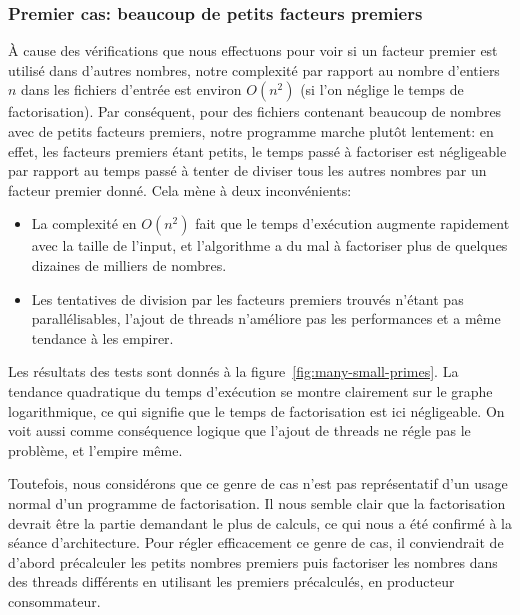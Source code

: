 \documentclass[a4paper,10pt]{article}
\begin{document}
\newpage
\subsubsection*{Premier cas: beaucoup de petits facteurs premiers}

À cause des vérifications que nous effectuons pour voir si un facteur premier est utilisé dans d'autres nombres, notre complexité par rapport au nombre d'entiers $n$ dans les fichiers d'entrée est environ $O(n^2)$ (si l'on néglige le temps de factorisation). Par conséquent, pour des fichiers contenant beaucoup de nombres avec de petits facteurs premiers, notre programme marche plutôt lentement: en effet, les facteurs premiers étant petits, le temps passé à factoriser est négligeable par rapport au temps passé à tenter de diviser tous les autres nombres par un facteur premier donné. Cela mène à deux inconvénients:
\begin{itemize}
    \item La complexité en $O(n^2)$ fait que le temps d'exécution augmente rapidement avec la taille de l'input, et l'algorithme a du mal à factoriser plus de quelques dizaines de milliers de nombres.
    \item Les tentatives de division par les facteurs premiers trouvés n'étant pas parallélisables, l'ajout de threads n'améliore pas les performances et a même tendance à les empirer.
\end{itemize}

Les résultats des tests sont donnés à la figure~\ref{fig:many-small-primes}. La tendance quadratique du temps d'exécution se montre clairement sur le graphe logarithmique, ce qui signifie que le temps de factorisation est ici négligeable. On voit aussi comme conséquence logique que l'ajout de threads ne régle pas le problème, et l'empire même.

Toutefois, nous considérons que ce genre de cas n'est pas représentatif d'un usage normal d'un programme de factorisation. Il nous semble clair que la factorisation devrait être la partie demandant le plus de calculs, ce qui nous a été confirmé à la séance d'architecture. Pour régler efficacement ce genre de cas, il conviendrait de d'abord précalculer les petits nombres premiers puis factoriser les nombres dans des threads différents en utilisant les premiers précalculés, en producteur consommateur.
\end{document}
